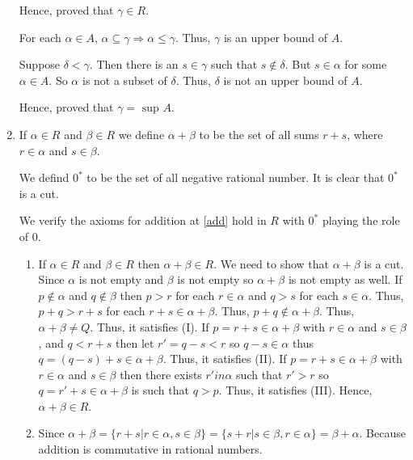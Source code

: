 \begin{enumerate}[{\bf Step 1.}]
Hence, proved that $\gamma \in R$.

For each $\alpha \in A$, $\alpha \subseteq \gamma \Rightarrow \alpha \leq \gamma$. Thus, $\gamma$ is an upper bound of $A$.

Suppose $\delta < \gamma$. Then there is an $s \in \gamma$ such that $s \notin \delta$.
But $s \in \alpha$ for some $\alpha \in A$. So $\alpha$ is not a subset of $\delta$.
Thus, $\delta$ is not an upper bound of $A$.

Hence, proved that $\gamma = \text{ sup } A$.

\item If $\alpha \in R$ and $\beta \in R$ we define $\alpha + \beta$ to be the set of all sums $r + s$,
where $r \in \alpha$ and $s \in \beta$.

We defind $0^*$ to be the set of all negative rational number.
It is clear that $0^*$ is a cut. 

We verify the axioms for addition at \ref{add} hold in $R$ with $0^*$ playing the role of $0$.

\begin{enumerate}[(\text{A}1)]
    \item If $\alpha \in R$ and $\beta \in R$ then $\alpha + \beta \in R$.
    \bigbreak \quad 
    We need to show that $\alpha + \beta$ is a cut. 
    Since $\alpha$ is not empty and $\beta$ is not empty so $\alpha + \beta$ is not empty as well.
    \bigbreak \quad
    If $p \notin \alpha$ and $q \notin \beta$ then $p > r$ for each $r \in \alpha$ and $q > s$ for each $s \in \alpha$.
    Thus, $p + q > r + s$ for each $r + s \in \alpha + \beta$. Thus, $p + q \notin \alpha + \beta$.
    Thus, $\alpha + \beta \neq Q$. Thus, it satisfies (I).
    \bigbreak \quad
    If $p = r + s \in \alpha + \beta$ with $r \in \alpha$ and $s \in \beta$, and $q < r + s$
    then let $r' = q - s < r$ so $q - s \in \alpha$ thus $q = (q - s) + s \in \alpha + \beta$.
    Thus, it satisfies (II).
    \bigbreak \quad
    If $p = r + s \in \alpha + \beta$ with $r \in \alpha$ and $s \in \beta$ then there exists
    $r' in \alpha$ such that $r' > r$ so $q = r' + s \in \alpha + \beta$ is such that $q > p$. 
    Thus, it satisfies (III).
    \bigbreak \quad
    Hence, $\alpha + \beta \in R$.

    \item Since $\alpha + \beta = \{ r + s | r \in \alpha , s \in \beta \} = \{ s + r | s \in \beta, r \in \alpha \} = \beta + \alpha$. 
    Because addition is commutative in rational numbers.
        

\end{enumerate}
\end{enumerate}
